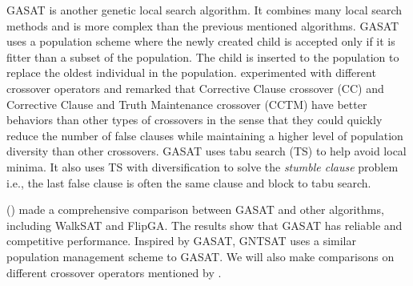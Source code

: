 GASAT \parencite{lardeux2006gasat} is another genetic local search algorithm. It
combines many local search methods and is more complex than the previous
mentioned algorithms. GASAT uses a population scheme where the newly created
child is accepted only if it is fitter than a subset of the population. The
child is inserted to the population to replace the oldest individual in the
population. \citeauthor{lardeux2006gasat} experimented with different crossover
operators and remarked that Corrective Clause crossover (CC) and Corrective
Clause and Truth Maintenance crossover (CCTM) have better behaviors than other
types of crossovers in the sense that they could quickly reduce the number of
false clauses while maintaining a higher level of population diversity than
other crossovers. GASAT uses tabu search (TS) to help avoid local minima. It
also uses TS with diversification to solve the \textit{stumble clause} problem
i.e., the last false clause is often the same clause and block to tabu search.

\citeauthor{lardeux2006gasat} (\citeyear{lardeux2006gasat}) made a comprehensive comparison between GASAT and other
algorithms, including WalkSAT and FlipGA. The results show that GASAT has
reliable and competitive performance. Inspired by GASAT, GNTSAT uses a similar
population management scheme to GASAT. We will also make comparisons on
different crossover operators mentioned by \citeauthor{lardeux2006gasat}.
